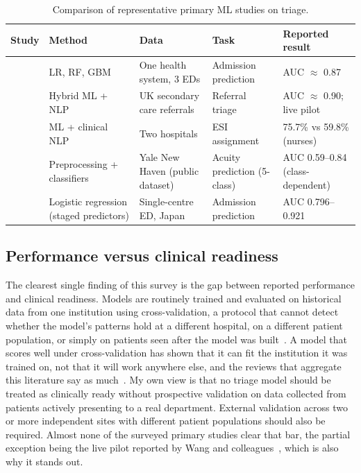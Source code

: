 \documentclass[11pt]{article}
\begin{document}
\begin{table}[H]
\centering
\caption{Comparison of representative primary ML studies on triage.}
\label{tab:comparison}
\begin{tabular}{c p{3cm} p{2.7cm} p{2.8cm} p{2.8cm}}
\toprule
\textbf{Study} & \textbf{Method} & \textbf{Data} & \textbf{Task} & \textbf{Reported result} \\
\midrule
\cite{Hong2018PredictingHA} & LR, RF, GBM & One health system, 3 EDs & Admission prediction & AUC $\approx$ 0.87 \\
\cite{Wang2023} & Hybrid ML + NLP & UK secondary care referrals & Referral triage & AUC $\approx$ 0.90; live pilot \\
\cite{Ivanov2021} & ML + clinical NLP & Two hospitals & ESI assignment & 75.7\% vs 59.8\% (nurses) \\
\cite{Vantu2023} & Preprocessing + classifiers & Yale New Haven (public dataset) & Acuity prediction (5-class) & AUC 0.59--0.84 (class-dependent) \\
\cite{Yoshimura2026} & Logistic regression (staged predictors) & Single-centre ED, Japan & Admission prediction & AUC 0.796--0.921 \\
\bottomrule
\end{tabular}
\end{table}

\subsection{Performance versus clinical readiness}

The clearest single finding of this survey is the gap between reported performance and clinical readiness. Models are routinely trained and evaluated on historical data from one institution using cross-validation, a protocol that cannot detect whether the model's patterns hold at a different hospital, on a different patient population, or simply on patients seen after the model was built~\cite{Sanchez2022, Fernandes}. A model that scores well under cross-validation has shown that it can fit the institution it was trained on, not that it will work anywhere else, and the reviews that aggregate this literature say as much~\cite{Sanchez2022}. My own view is that no triage model should be treated as clinically ready without prospective validation on data collected from patients actively presenting to a real department. External validation across two or more independent sites with different patient populations should also be required. Almost none of the surveyed primary studies clear that bar, the partial exception being the live pilot reported by Wang and colleagues~\cite{Wang2023}, which is also why it stands out.
\end{document}

